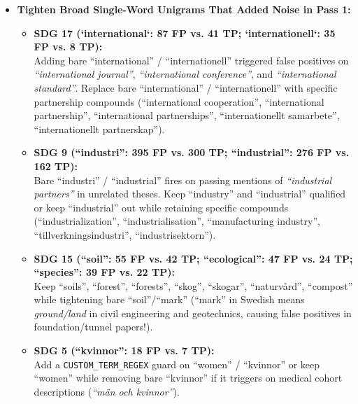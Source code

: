 \begin{itemize}
    \item \textbf{Tighten Broad Single-Word Unigrams That Added Noise in Pass 1:}
    \begin{itemize}
    \item \textbf{SDG 17 (`international`: 87 FP vs. 41 TP; `internationell`: 35 FP vs. 8 TP):}\\
    Adding bare \enquote{international} / \enquote{internationell} triggered false positives on \textit{\enquote{international journal}}, \textit{\enquote{international conference}}, and \textit{\enquote{international standard}}. Replace bare \enquote{international} / \enquote{internationell} with specific partnership compounds (\enquote{international cooperation}, \enquote{international partnership}, \enquote{international partnerships}, \enquote{internationellt samarbete}, \enquote{internationellt partnerskap}).

    \item \textbf{SDG 9 (\enquote{industri}: 395 FP vs. 300 TP; \enquote{industrial}: 276 FP vs. 162 TP):}\\
    
    Bare \enquote{industri} / \enquote{industrial} fires on passing mentions of \textit{\enquote{industrial partners}} in unrelated theses. Keep \enquote{industry} and \enquote{industrial} qualified or keep \enquote{industrial} out while retaining specific compounds (\enquote{industrialization}, \enquote{industrialisation}, \enquote{manufacturing industry}, \enquote{tillverkningsindustri}, \enquote{industrisektorn}).


    \item \textbf{SDG 15 (\enquote{soil}: 55 FP vs. 42 TP; \enquote{ecological}: 47 FP vs. 24 TP; \enquote{species}: 39 FP vs. 22 TP):}\\
    Keep \enquote{soils}, \enquote{forest}, \enquote{forests}, \enquote{skog}, \enquote{skogar}, \enquote{naturvård}, \enquote{compost} while tightening bare \enquote{soil}/\enquote{mark} (\enquote{mark} in Swedish means \textit{ground/land} in civil engineering and geotechnics, causing false positives in foundation/tunnel papers!).

    \item \textbf{SDG 5 (\enquote{kvinnor}: 18 FP vs. 7 TP):}\\
    Add a \texttt{CUSTOM\_TERM\_REGEX} guard on \enquote{women} / \enquote{kvinnor} or keep \enquote{women} while removing bare \enquote{kvinnor} if it triggers on medical cohort descriptions (\textit{\enquote{män och kvinnor}}).



\end{itemize}
\end{itemize}
